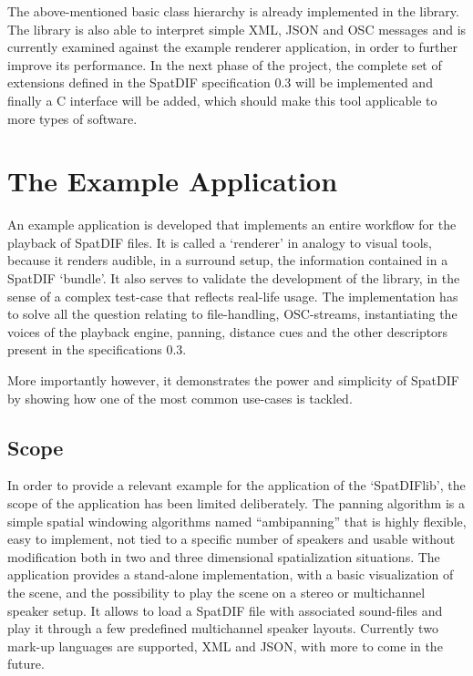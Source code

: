 \documentclass[a4paper]{article}
\begin{document}
The above-mentioned basic class hierarchy is already implemented in the library. 
The library is also able to interpret simple XML, JSON and OSC messages and is currently examined against the example renderer application, in order to further improve its performance.  
In the next phase of the project, the complete set of extensions defined in the SpatDIF specification 0.3 will be implemented and finally a C interface will be added, which should make this tool applicable to more types of software. 

\section{The Example Application}%

An example application is developed that implements an entire workflow for the playback of SpatDIF files. 
It is called a `renderer' in analogy to visual tools, because it renders audible, in a surround setup, the information contained in a SpatDIF `bundle'.
It also serves to validate the development of the library, in the sense of a complex test-case that reflects real-life usage.
The implementation has to solve all the question relating to file-handling, OSC-streams, instantiating the voices of the playback engine, panning, distance cues and the other descriptors present in the specifications 0.3.

More importantly however, it demonstrates the power and simplicity of SpatDIF by showing how one of the most common use-cases is tackled.

\subsection{Scope}

In order to provide a relevant example for the application of the `SpatDIFlib', the scope of the application has been limited deliberately.
The panning algorithm is a simple spatial windowing algorithms named ``ambipanning'' \cite{Neukom:2008ambipan} that %
is highly flexible, easy to implement, not tied to a specific number of speakers and usable without modification both in two and three dimensional spatialization situations.
The application provides a stand-alone implementation, with a basic visualization of the scene, and the possibility to play the scene on a stereo or multichannel speaker setup.
It allows to load a SpatDIF file with associated sound-files and play it through a few predefined multichannel speaker layouts.
Currently two mark-up languages are supported, XML and JSON, with more to come in the future.
\end{document}
